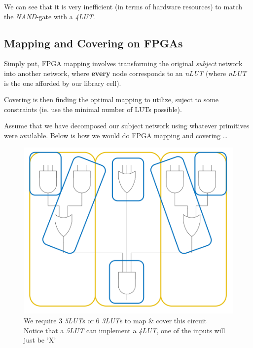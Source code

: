 \documentclass{article}
\begin{document}
We can see that it is very inefficient (in terms of hardware resources) to match the \textit{NAND}-gate with a \textit{4LUT}.

\newpage
\subsection{Mapping and Covering on FPGAs}
Simply put, FPGA mapping involves transforming the original \textit{subject} network into another network,
where \textbf{every} node corresponds to an \textit{nLUT} (where \textit{nLUT} is the one afforded by our library cell).

Covering is then finding the optimal mapping to utilize, suject to some constraints (ie. use the minimal number of LUTs possible).

Assume that we have decomposed our subject network using whatever primitives were available. Below is how we would do FPGA mapping and covering \dots

\begin{figure}[htp]
    \centering
    \includegraphics[width=12cm, scale=1]{S7/fpgaMapping.PNG}
    \captionsetup{justification=centering}
    \caption{We require 3 \textit{5LUT}s or 6 \textit{3LUT}s to map \& cover this circuit\\
                Notice that a \textit{5LUT} can implement a \textit{4LUT}, one of the inputs will just be 'X'}
\end{figure}
\end{document}
